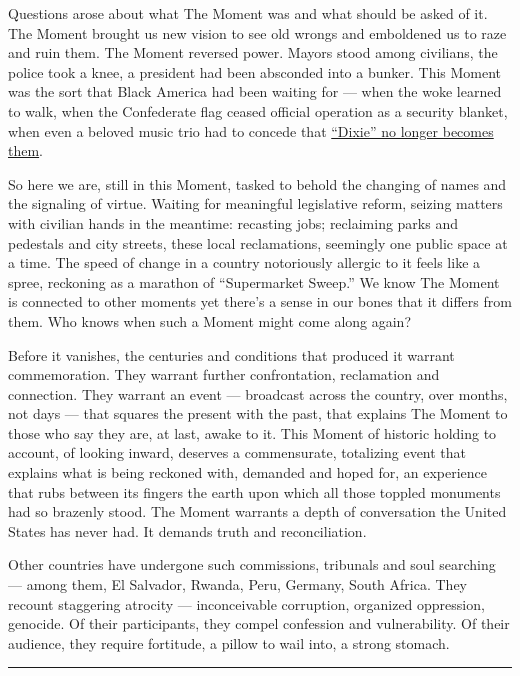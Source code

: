 Questions arose about what The Moment was and what should be asked of
it. The Moment brought us new vision to see old wrongs and emboldened us
to raze and ruin them. The Moment reversed power. Mayors stood among
civilians, the police took a knee, a president had been absconded into a
bunker. This Moment was the sort that Black America had been waiting for
--- when the woke learned to walk, when the Confederate flag ceased
official operation as a security blanket, when even a beloved music trio
had to concede that
\href{https://www.nytimes.com/2020/06/25/arts/music/dixie-chicks-change-name.html}{``Dixie''
no longer becomes them}.

So here we are, still in this Moment, tasked to behold the changing of
names and the signaling of virtue. Waiting for meaningful legislative
reform, seizing matters with civilian hands in the meantime: recasting
jobs; reclaiming parks and pedestals and city streets, these local
reclamations, seemingly one public space at a time. The speed of change
in a country notoriously allergic to it feels like a spree, reckoning as
a marathon of ``Supermarket Sweep.'' We know The Moment is connected to
other moments yet there's a sense in our bones that it differs from
them. Who knows when such a Moment might come along again?

Before it vanishes, the centuries and conditions that produced it
warrant commemoration. They warrant further confrontation, reclamation
and connection. They warrant an event --- broadcast across the country,
over months, not days --- that squares the present with the past, that
explains The Moment to those who say they are, at last, awake to it.
This Moment of historic holding to account, of looking inward, deserves
a commensurate, totalizing event that explains what is being reckoned
with, demanded and hoped for, an experience that rubs between its
fingers the earth upon which all those toppled monuments had so brazenly
stood. The Moment warrants a depth of conversation the United States has
never had. It demands truth and reconciliation.

Other countries have undergone such commissions, tribunals and soul
searching --- among them, El Salvador, Rwanda, Peru, Germany, South
Africa. They recount staggering atrocity --- inconceivable corruption,
organized oppression, genocide. Of their participants, they compel
confession and vulnerability. Of their audience, they require fortitude,
a pillow to wail into, a strong stomach.

\begin{center}\rule{0.5\linewidth}{\linethickness}\end{center}

